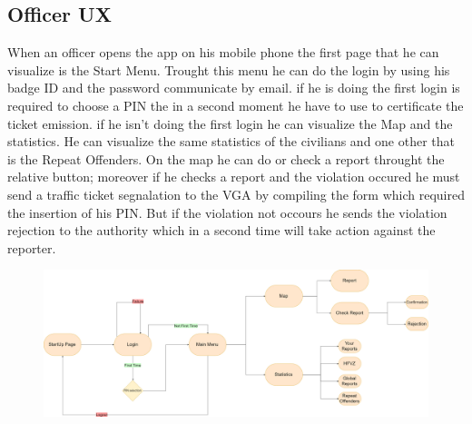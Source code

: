 \documentclass[12pt,a4paper]{article}
\begin{document}
\subsection{Officer UX}
When an officer opens the app on his mobile phone the first page that he can visualize is the Start Menu. Trought this menu he can do the login by using his badge ID and the password communicate by email. if he is doing the first login is required to choose a PIN the in a second moment he have to use to certificate the ticket emission. if he isn't doing the first login he can visualize the Map and the statistics. He can visualize the same statistics of the civilians and one other that is the Repeat Offenders. On the map he can do or check a report throught the relative button; moreover if he checks a report and the violation occured he must send a traffic ticket segnalation to the VGA by compiling the form which required the insertion of his PIN. But if the violation not occours he sends the violation rejection to the authority which in a second time will take action against the reporter.
\begin{figure}[H]
		\centering
			\includegraphics[width=1.0\linewidth]{Images/UX/OfficerUX}
\end{figure}
\end{document}

